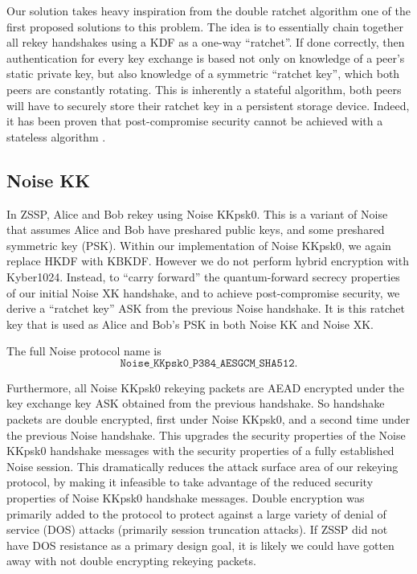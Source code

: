 \documentclass{article}
\begin{document}
Our solution takes heavy inspiration from the double ratchet algorithm \cite{signal} one of the first proposed solutions to this problem. The idea is to essentially chain together all rekey handshakes using a KDF as a one-way ``ratchet''. If done correctly, then authentication for every key exchange is based not only on knowledge of a peer's static private key, but also knowledge of a symmetric ``ratchet key'', which both peers are constantly rotating. This is inherently a stateful algorithm, both peers will have to securely store their ratchet key in a persistent storage device. Indeed, it has been proven that post-compromise security cannot be achieved with a stateless algorithm \cite{post_compromise_security}.

\subsection{Noise KK}\label{sec:ratchet_design}

In ZSSP, Alice and Bob rekey using Noise KKpsk0. This is a variant of Noise that assumes Alice and Bob have preshared public keys, and some preshared symmetric key (PSK). Within our implementation of Noise KKpsk0, we again replace HKDF with KBKDF. However we do not perform hybrid encryption with Kyber1024. Instead, to ``carry forward'' the quantum-forward secrecy properties of our initial Noise XK handshake, and to achieve post-compromise security, we derive a ``ratchet key'' ASK from the previous Noise handshake. It is this ratchet key that is used as Alice and Bob's PSK in both Noise KK and Noise XK.

The full Noise protocol name is $$\texttt{Noise\_KKpsk0\_P384\_AESGCM\_SHA512}.$$

Furthermore, all Noise KKpsk0 rekeying packets are AEAD encrypted under the key exchange key ASK obtained from the previous handshake. So handshake packets are double encrypted, first under Noise KKpsk0, and a second time under the previous Noise handshake. This upgrades the security properties of the Noise KKpsk0 handshake messages with the security properties of a fully established Noise session. This dramatically reduces the attack surface area of our rekeying protocol, by making it infeasible to take advantage of the reduced security properties of Noise KKpsk0 handshake messages. Double encryption was primarily added to the protocol to protect against a large variety of denial of service (DOS) attacks (primarily session truncation attacks). If ZSSP did not have DOS resistance as a primary design goal, it is likely we could have gotten away with not double encrypting rekeying packets.
\end{document}
